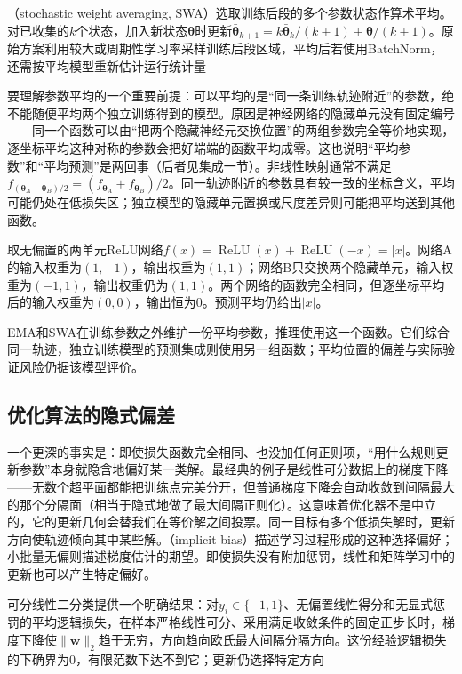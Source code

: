 （stochastic weight averaging, SWA）选取训练后段的多个参数状态作算术平均。对已收集的$k$个状态，加入新状态$\bm\theta$时更新$\bar{\bm\theta}_{k+1}=k\bar{\bm\theta}_k/(k+1)+\bm\theta/(k+1)$。原始方案利用较大或周期性学习率采样训练后段区域，平均后若使用BatchNorm，还需按平均模型重新估计运行统计量

要理解参数平均的一个重要前提：可以平均的是“同一条训练轨迹附近”的参数，绝不能随便平均两个独立训练得到的模型。原因是神经网络的隐藏单元没有固定编号——同一个函数可以由“把两个隐藏神经元交换位置”的两组参数完全等价地实现，逐坐标平均这种对称的参数会把好端端的函数平均成零。这也说明“平均参数”和“平均预测”是两回事（后者见集成一节）。非线性映射通常不满足$f_{(\bm\theta_A+\bm\theta_B)/2}=(f_{\bm\theta_A}+f_{\bm\theta_B})/2$。同一轨迹附近的参数具有较一致的坐标含义，平均可能仍处在低损失区；独立模型的隐藏单元置换或尺度差异则可能把平均送到其他函数。

\begin{example}[等价网络的参数平均可以失效]
  \label{ex:generalization-parameter-average}
  取无偏置的两单元ReLU网络$f(x)=\operatorname{ReLU}(x)+\operatorname{ReLU}(-x)=|x|$。网络A的输入权重为$(1,-1)$，输出权重为$(1,1)$；网络B只交换两个隐藏单元，输入权重为$(-1,1)$，输出权重仍为$(1,1)$。两个网络的函数完全相同，但逐坐标平均后的输入权重为$(0,0)$，输出恒为0。预测平均仍给出$|x|$。
\end{example}

EMA和SWA在训练参数之外维护一份平均参数，推理使用这一个函数。它们综合同一轨迹，独立训练模型的预测集成则使用另一组函数；平均位置的偏差与实际验证风险仍据该模型评价。

\subsection{优化算法的隐式偏差}
\label{sec:generalization-implicit-bias}

一个更深的事实是：即使损失函数完全相同、也没加任何正则项，“用什么规则更新参数”本身就隐含地偏好某一类解。最经典的例子是线性可分数据上的梯度下降——无数个超平面都能把训练点完美分开，但普通梯度下降会自动收敛到间隔最大的那个分隔面（相当于隐式地做了最大间隔正则化）。这意味着优化器不是中立的，它的更新几何会替我们在等价解之间投票。同一目标有多个低损失解时，更新方向使轨迹倾向其中某些解。（implicit bias）描述学习过程形成的这种选择偏好；小批量无偏则描述梯度估计的期望。即使损失没有附加惩罚，线性和矩阵学习中的更新也可以产生特定偏好。

可分线性二分类提供一个明确结果：对$y_i\in\{-1,1\}$、无偏置线性得分和无显式惩罚的平均逻辑损失，在样本严格线性可分、采用满足收敛条件的固定正步长时，梯度下降使$\lVert\bm w\rVert_2$趋于无穷，方向趋向欧氏最大间隔分隔方向。这份经验逻辑损失的下确界为0，有限范数下达不到它；更新仍选择特定方向

